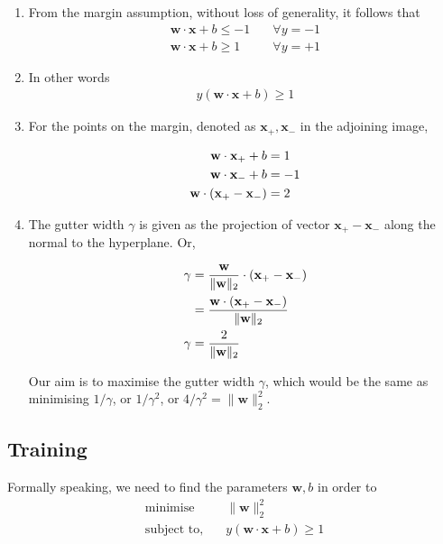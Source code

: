 \documentclass[11pt]{article}
\begin{document}
\begin{enumerate}
\item From the margin assumption, without loss of
generality, it follows that \\[0pt]
\begin{align*}
   \mathbf{w}\cdot\mathbf{x}+b \leqslant -1 &\quad
   \forall y=-1 \\
   \mathbf{w}\cdot\mathbf{x}+b \geqslant 1 &\quad
   \forall y=+1
\end{align*}

\item In other words
\begin{align}
  y(\mathbf{w}\cdot\mathbf{x}+b) \geqslant 1
\end{align}

\item For the points on the margin, denoted as
\(\mathbf{x}_{+}, \mathbf{x}_{-}\) in the adjoining
image,

\begin{align}
  \notag\mathbf{w}\cdot\mathbf{x}_{+} + b &= 1 \\
  \notag\mathbf{w}\cdot\mathbf{x}_{-} + b &= -1 \\
  \mathbf{w}\cdot(\mathbf{x}_{+}-\mathbf{x}_{-}) &= 2
\end{align}

\item The gutter width \(\gamma\) is given as the
projection of vector \(\mathbf{x}_{+} -
    \mathbf{x}_{-}\) along the normal to the hyperplane.
Or,

\begin{align}
  \notag
  \gamma &= \frac{\mathbf{w}}{\|\mathbf{w}\|_2} \cdot
           (\mathbf{x}_{+}-\mathbf{x}_{-}) \\
  \notag &= \frac{\mathbf{w}\cdot
           (\mathbf{x}_{+}-\mathbf{x}_{-})}
           {\|\mathbf{w}\|_2} \\
  \gamma &= \frac{2}{\|\mathbf{w}\|_2}
\end{align}

Our aim is to maximise the gutter width \(\gamma\),
which would be the same as minimising \(1/\gamma\),
or \(1/\gamma^{2}\), or \(4/\gamma^{2} =
    \|\mathbf{w}\|_{2}^{2}\).
\end{enumerate}


\subsection{Training}
\label{sec:orgd6f2039}

Formally speaking, we need to find the parameters
\(\mathbf{w},b\) in order to
\begin{align*}
  \text{minimise} &\quad\|\mathbf{w}\|_2^2 \\
  \text{subject to,} &\quad y(\mathbf{w}\cdot\mathbf{x}
                      + b) \geqslant 1
\end{align*}
\end{document}
